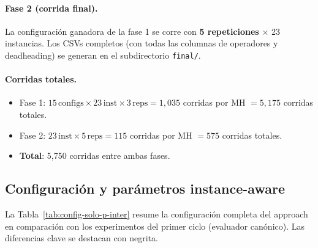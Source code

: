 \paragraph{Fase 2 (corrida final).}
La configuración ganadora de la fase 1 se corre con \textbf{5
repeticiones} $\times$ 23 instancias. Los CSVs completos (con todas
las columnas de operadores y deadheading) se generan en el
subdirectorio \texttt{final/}.

\paragraph{Corridas totales.}
\begin{itemize}
\item Fase 1: $15\,\text{configs} \times 23\,\text{inst} \times
  3\,\text{reps} = 1{,}035$ corridas por MH
  $= 5{,}175$ corridas totales.
\item Fase 2: $23\,\text{inst} \times 5\,\text{reps} = 115$ corridas
  por MH $= 575$ corridas totales.
\item \textbf{Total}: 5{,}750 corridas entre ambas fases.
\end{itemize}

\subsection{Configuración y parámetros instance-aware}

La Tabla~\ref{tab:config-solo-p-inter} resume la configuración
completa del approach en comparación con los experimentos del primer
ciclo (evaluador canónico). Las diferencias clave se destacan con
negrita.

